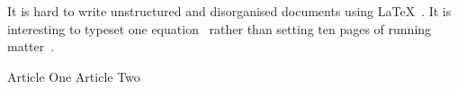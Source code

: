 \documentclass{article}
\begin{document}
It is hard to write unstructured and disorganised documents using
\LaTeX~\cite{key1}. It is interesting to typeset one
equation~\cite[Sec 3.3]{key2} rather than setting ten pages of
running matter~\cite{key1,key2}.

\begin{thebibliography}{99}
  Article One
  Article Two
\end{thebibliography}
\end{document}
